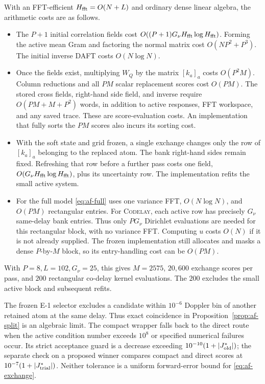 With an FFT-efficient $H_{\rm fft}=O(N+L)$ and ordinary dense
linear algebra, the arithmetic costs are as follows.
\begin{itemize}
\item The $P+1$ initial correlation fields cost
$O((P+1)G_\nu H_{\rm fft}\log H_{\rm fft})$. Forming the active mean
Gram and factoring the normal matrix cost $O(NP^2+P^3)$.
The initial inverse DAFT costs $O(N\log N)$.
\item Once the fields exist, multiplying $W_Q$ by the matrix
$[k_a]_a$ costs $O(P^2M)$. Column reductions and all $PM$ scalar
replacement scores cost $O(PM)$. The stored cross fields, right-hand
side field, and inverse require $O(PM+M+P^2)$ words, in addition to
active responses, FFT workspace, and any saved trace.
These are score-evaluation costs. An implementation that fully sorts
the $PM$ scores also incurs its sorting cost.
\item With the soft state and grid frozen, a single exchange changes
only the row of $[k_a]_a$ belonging to the replaced atom. The bank
right-hand sides remain fixed. Refreshing that row before a further
pass costs one field, $O(G_\nu H_{\rm fft}\log H_{\rm fft})$, plus
its uncertainty row. The implementation refits the small active system.
\item For the full model \eqref{eq:af-full} uses one variance FFT,
$O(N\log N)$, and $O(PM)$ rectangular entries. For \textsc{Codelay},
each active row has precisely $G_\nu$ same-delay bank entries. Thus
only $PG_\nu$ Dirichlet evaluations are needed for this rectangular
block, with no variance FFT. Computing $u$ costs $O(N)$ if it is not
already supplied. The frozen implementation still allocates and masks
a dense $P$-by-$M$ block, so its entry-handling cost can be $O(PM)$.
\end{itemize}
With $P=8,L=102,G_\nu=25$, this gives $M=2575$, $20{,}600$ exchange
scores per pass, and $200$ rectangular co-delay kernel evaluations.
The $200$ excludes the small active block and subsequent refits.

\begin{afdmremark}
The frozen E-1 selector excludes a candidate within $10^{-6}$ Doppler
bin of another retained atom at the same delay. Thus exact coincidence
in Proposition~\ref{prop:af-split} is an algebraic limit. The compact
wrapper falls back to the direct route when the active condition number
exceeds $10^8$ or specified numerical failures occur. Its strict
acceptance guard is a decrease exceeding $10^{-10}(1+|J_{\rm old}^*|)$;
the separate check on a proposed winner compares compact and direct
scores at $10^{-7}(1+|J_{\rm trial}^*|)$. Neither tolerance is a
uniform forward-error bound for \eqref{eq:af-exchange}.
\end{afdmremark}

